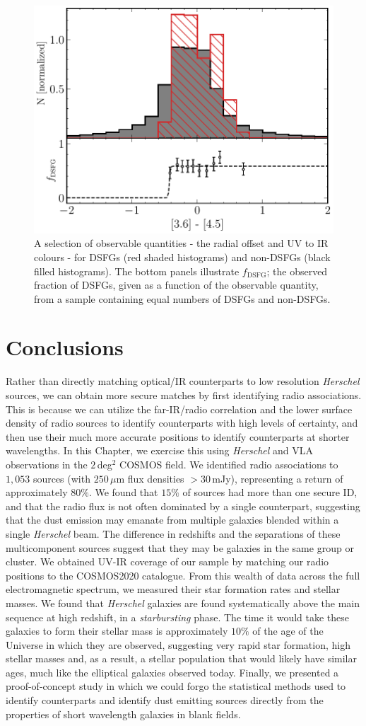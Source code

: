 \begin{figure}
	\includegraphics[width=0.49\columnwidth, height=0.25\textheight]{Figures/3645_smg.pdf}
	\caption[Historgams of DSFGs compared to non-DSFGs in COSMOS]{A selection of observable quantities - the radial offset and UV to IR colours - for DSFGs (red shaded histograms) and non-DSFGs (black filled histograms). The bottom panels illustrate $f_\textrm{DSFG}$; the observed fraction of DSFGs, given as a function of the observable quantity, from a sample containing equal numbers of DSFGs and non-DSFGs.}
	\label{fig:smg_nonsmg}
\end{figure}

\section{Conclusions}

Rather than directly matching optical/IR counterparts to low resolution \textit{Herschel} sources, we can obtain more secure matches by first identifying radio associations. This is because we can utilize the far-IR/radio correlation and the lower surface density of radio sources to identify counterparts with high levels of certainty, and then use their much more accurate positions to identify counterparts at shorter wavelengths. In this Chapter, we exercise this using \textit{Herschel} and VLA observations in the $2\,$deg$^2$ COSMOS field. We identified radio associations to $1,053$ sources (with $250\,\mu$m flux densities $> 30\,$mJy), representing a return of approximately $80\%$. We found that $15\%$ of sources had more than one secure ID, and that the radio flux is not often dominated by a single counterpart, suggesting that the dust emission may emanate from multiple galaxies blended within a single \textit{Herschel} beam. The difference in redshifts and the separations of these multicomponent sources suggest that they may be galaxies in the same group or cluster. We obtained UV-IR coverage of our sample by matching our radio positions to the COSMOS2020 catalogue. From this wealth of data across the full electromagnetic spectrum, we measured their star formation rates and stellar masses. We found that \textit{Herschel} galaxies are found systematically above the main sequence at high redshift, in a \textit{starbursting} phase. The time it would take these galaxies to form their stellar mass is approximately $10\%$ of the age of the Universe in which they are observed, suggesting very rapid star formation, high stellar masses and, as a result, a stellar population that would likely have similar ages, much like the elliptical galaxies observed today. Finally, we presented a proof-of-concept study in which we could forgo the statistical methods used to identify counterparts and identify dust emitting sources directly from the properties of short wavelength galaxies in blank fields.
